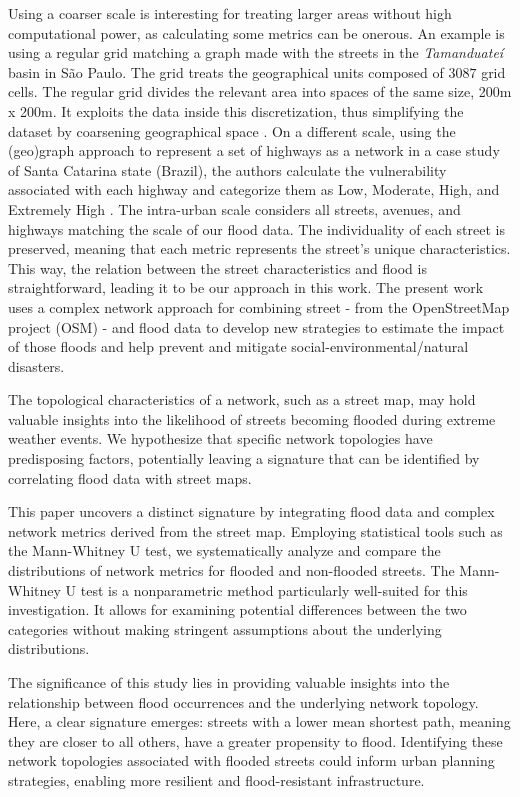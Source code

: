 \documentclass[sn-nature]{sn-jnl}%
\theoremstyle{thmstyleone}%
\theoremstyle{thmstyletwo}%
\theoremstyle{thmstylethree}%
\begin{document}
Using a coarser scale is interesting for treating larger areas without high computational power, as calculating some metrics can be onerous. An example is using a regular grid matching a graph made with the streets in the \textit{Tamanduateí} basin in São Paulo. The grid treats the geographical units composed of $3087$ grid cells.
The regular grid divides the relevant area into spaces of the same size, 200m x 200m. It exploits the data inside this discretization, thus simplifying the dataset by coarsening geographical space \cite{Tomas2022}.
On a different scale, using the (geo)graph approach to represent a set of highways as a network in a case study of Santa Catarina state (Brazil), the authors calculate the vulnerability associated with each highway and categorize them as Low, Moderate, High, and Extremely High \cite{frontiers_vul}.
The intra-urban scale considers all streets, avenues, and highways matching the scale of our flood data. The individuality of each street is preserved, meaning that each metric represents the street's unique characteristics.
This way, the relation between the street characteristics and flood is straightforward, leading it to be our approach in this work.
The present work uses a complex network approach for combining street - from the OpenStreetMap project (OSM) - and flood data to develop new strategies to estimate the impact of those floods and help prevent and mitigate social-environmental/natural disasters. 

The topological characteristics of a network, such as a street map, may hold valuable insights into the likelihood of streets becoming flooded during extreme weather events.
We hypothesize that specific network topologies have predisposing factors, potentially leaving a signature that can be identified by correlating flood data with street maps.

This paper uncovers a distinct signature by integrating flood data and complex network metrics derived from the street map.
Employing statistical tools such as the Mann-Whitney U test, we systematically analyze and compare the distributions of network metrics for flooded and non-flooded streets.
The Mann-Whitney U test is a nonparametric method particularly well-suited for this investigation. It allows for examining potential differences between the two categories without making stringent assumptions about the underlying distributions.

The significance of this study lies in providing valuable insights into the relationship between flood occurrences and the underlying network topology. Here, a clear signature emerges: streets with a lower mean shortest path, meaning they are closer to all others, have a greater propensity to flood.
Identifying these network topologies associated with flooded streets could inform urban planning strategies, enabling more resilient and flood-resistant infrastructure.
\end{document}
